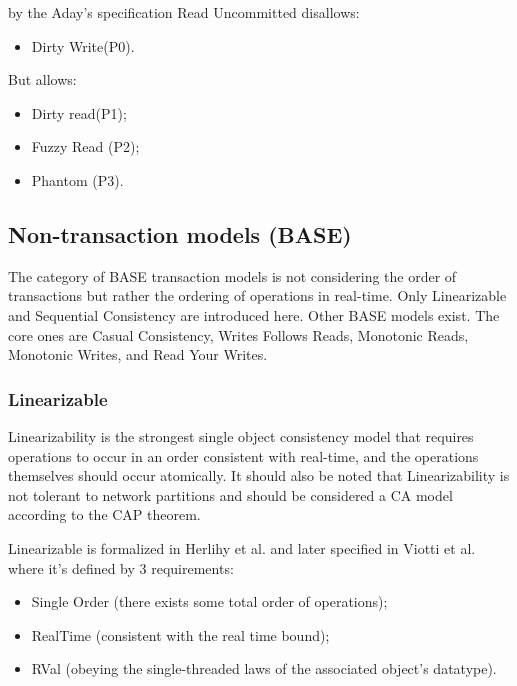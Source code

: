\documentclass[a4paper,10pt,titlepage]{report}
\begin{document}
by the Aday's specification Read Uncommitted disallows:
\begin{itemize}
    \item Dirty Write(P0).
\end{itemize}
But allows:
\begin{itemize}
    \item Dirty read(P1);
    \item Fuzzy Read (P2);
    \item Phantom (P3).
\end{itemize}

\subsection{Non-transaction models (BASE)}
The category of BASE transaction models is not considering the order of transactions but rather the ordering of operations in real-time. Only Linearizable and Sequential Consistency are introduced here. Other BASE models exist. The core ones are Casual Consistency, Writes Follows Reads, Monotonic Reads, Monotonic Writes, and Read Your Writes.

\subsubsection{Linearizable}
Linearizability is the strongest single object consistency model that requires operations to occur in an order consistent with real-time, and the operations themselves should occur atomically. It should also be noted that Linearizability is not tolerant to network partitions and should be considered a CA model according to the CAP theorem.

Linearizable is formalized in Herlihy et al.\cite{Linearizability} and later specified in Viotti et al. \cite{ConsistencyinNonTransactionalDistributedStorageSystems} where it's defined by 3 requirements:

\begin{itemize}
    \item Single Order (there exists some total order of operations);
    \item RealTime (consistent with the real time bound);
    \item RVal (obeying the single-threaded laws of the associated object's datatype).
\end{itemize}
\end{document}
